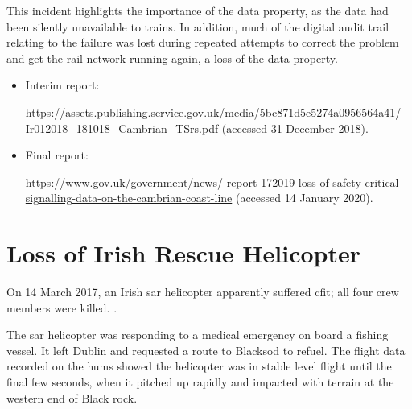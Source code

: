 This incident highlights the importance of the  \gls{data property}, as the data had been silently unavailable to trains. In addition, much of the digital audit trail relating to the failure was lost during repeated attempts to correct the problem and get the rail network running again, a loss of the  \gls{data property}.

\begin{samepage}
\begin{itemize}
\item Interim report: \raggedright{\href{https://assets.publishing.service.gov.uk/media/5bc871d5e5274a0956564a41/Ir012018_181018_Cambrian_TSrs.pdf}{https://assets.publishing.service.gov.uk/media/5bc871d5e5274a0956564a41/ Ir012018\_181018\_Cambrian\_TSrs.pdf} (accessed 31 December 2018).}
\item
  Final report: \raggedright{\href{https://www.gov.uk/government/news/report-172019-loss-of-safety-critical-signalling-data-on-the-cambrian-coast-line}{https://www.gov.uk/government/news/ report-172019-loss-of-safety-critical-signalling-data-on-the-cambrian-coast-line} (accessed 14 January 2020).}
\end{itemize}
\end{samepage}

\section{Loss of Irish Rescue Helicopter} \label{bkm:incacc:irishsar}
On 14 March 2017, an Irish \gls{sar} helicopter apparently suffered \gls{cfit}; all four crew members were killed. .

The \gls{sar} helicopter was responding to a medical emergency on board a fishing vessel. It left Dublin and requested a route to Blacksod to refuel. The flight data recorded on the \gls{hums} showed the helicopter was in stable level flight until the final few seconds, when it pitched up rapidly and impacted with terrain at the western end of Black rock.

